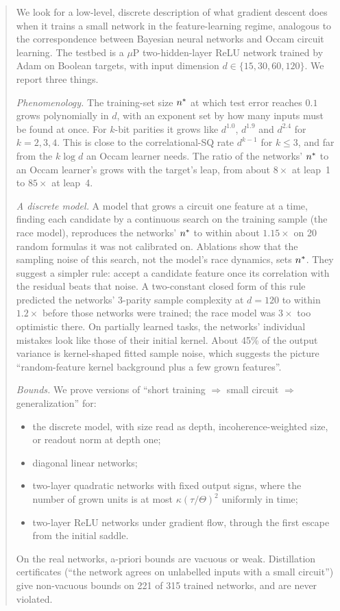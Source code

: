 \begin{abstract}
\noindent
We look for a low-level, discrete description of what gradient descent does when it trains a small network in the feature-learning regime, analogous to the correspondence between Bayesian neural networks and Occam circuit learning. The testbed is a $\mu$P two-hidden-layer ReLU network trained by Adam on Boolean targets, with input dimension $d\in\{15,30,60,120\}$. We report three things.

\emph{Phenomenology.} The training-set size $\nstar$ at which test error reaches $0.1$ grows polynomially in $d$, with an exponent set by how many inputs must be found at once. For $k$-bit parities it grows like $d^{1.0}$, $d^{1.9}$ and $d^{2.4}$ for $k=2,3,4$. This is close to the correlational-SQ rate $d^{k-1}$ for $k\le3$, and far from the $k\log d$ an Occam learner needs. The ratio of the networks' $\nstar$ to an Occam learner's grows with the target's leap, from about $8\times$ at leap~1 to $85\times$ at leap~4.

\emph{A discrete model.} A model that grows a circuit one feature at a time, finding each candidate by a continuous search on the training sample (the race model), reproduces the networks' $\nstar$ to within about $1.15\times$ on 20 random formulas it was not calibrated on. Ablations show that the sampling noise of this search, not the model's race dynamics, sets $\nstar$. They suggest a simpler rule: accept a candidate feature once its correlation with the residual beats that noise. A two-constant closed form of this rule predicted the networks' 3-parity sample complexity at $d=120$ to within $1.2\times$ before those networks were trained; the race model was $3\times$ too optimistic there. On partially learned tasks, the networks' individual mistakes look like those of their initial kernel. About 45\% of the output variance is kernel-shaped fitted sample noise, which suggests the picture ``random-feature kernel background plus a few grown features''.

\emph{Bounds.} We prove versions of ``short training $\Rightarrow$ small circuit $\Rightarrow$ generalization'' for:
\begin{itemize}
\item the discrete model, with size read as depth, incoherence-weighted size, or readout norm at depth one;
\item diagonal linear networks;
\item two-layer quadratic networks with fixed output signs, where the number of grown units is at most $\kappa(\tau/\Theta)^2$ uniformly in time;
\item two-layer ReLU networks under gradient flow, through the first escape from the initial saddle.
\end{itemize}
On the real networks, a-priori bounds are vacuous or weak. Distillation certificates (``the network agrees on unlabelled inputs with a small circuit'') give non-vacuous bounds on 221 of 315 trained networks, and are never violated.


\end{abstract}
